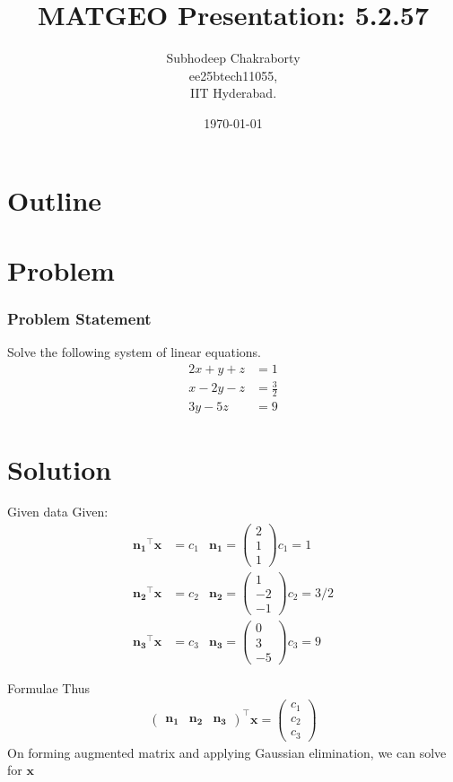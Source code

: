 \documentclass{beamer}
\title{MATGEO Presentation: 5.2.57}
\author{Subhodeep Chakraborty \\ ee25btech11055,\\IIT Hyderabad.}
\date{\today}
\theoremstyle{remark}
\newcommand{\myvec}[1]{\ensuremath{\begin{pmatrix}#1\end{pmatrix}}}
\let\vec\mathbf
\numberwithin{equation}{section}
\begin{document}
\begin{frame}
\titlepage
\end{frame}

\section*{Outline}
\begin{frame}
\tableofcontents
\end{frame}

\section{Problem}
\begin{frame}
\frametitle{Problem Statement}

Solve the following system of linear equations.
\begin{align*}
 2x+y+z&=1\\
 x-2y-z&=\frac{3}{2}\\
 3y-5z&=9
\end{align*}

\end{frame}

\section{Solution}
\begin{frame}{Given data}
Given:
\begin{align}
 \vec{n_1}^\top\vec{x}&=c_1 &\vec{n_1} = \myvec{2\\1\\1} c_1 = 1\\
 \vec{n_2}^\top\vec{x}&=c_2 &\vec{n_2} = \myvec{1\\-2\\-1} c_2 = 3/2\\
 \vec{n_3}^\top\vec{x}&=c_3 &\vec{n_3} = \myvec{0 \\3 \\ -5} c_3 = 9
\end{align}
\end{frame}

\begin{frame}{Formulae}
Thus
\begin{align}
  \myvec{\vec{n_1} & \vec{n_2} & \vec{n_3}}^\top\vec{x} = \myvec{c_1\\c_2\\c_3}
\end{align}
On forming augmented matrix and applying Gaussian elimination, we can solve for $\vec{x}$
\end{frame}
\end{document}

